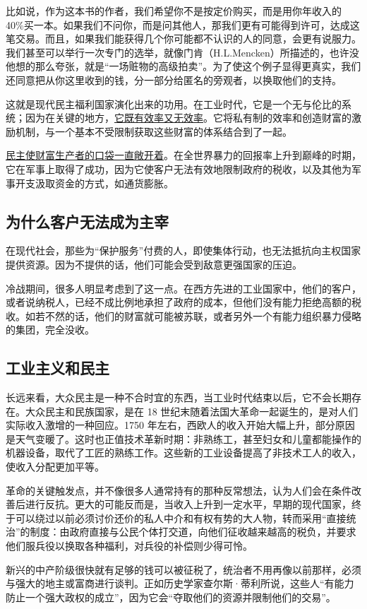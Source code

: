 比如说，作为这本书的作者，我们希望你不是按定价购买，而是用你年收入的 40\%买一本。如果我们不问你，而是问其他人，那我们更有可能得到许可，达成这笔交易。而且，如果我们能获得几个你可能都不认识的人的同意，会更有说服力。我们甚至可以举行一次专门的选举，就像门肯（H.L.Mencken）所描述的，也许没他想的那么夸张，就是“一场赃物的高级拍卖”。为了使这个例子显得更真实，我们还同意把从你这里收到的钱，分一部分给匿名的旁观者，以换取他们的支持。

这就是现代民主福利国家演化出来的功用。在工业时代，它是一个无与伦比的系统；因为在关键的地方，\uline{它既有效率又无效率}。它将私有制的效率和创造财富的激励机制，与一个基本不受限制获取这些财富的体系结合到了一起。

\uline{民主使财富生产者的口袋一直敞开着}。在全世界暴力的回报率上升到巅峰的时期，它在军事上取得了成功，因为它使客户无法有效地限制政府的税收，以及其他为军事开支汲取资金的方式，如通货膨胀。

\subsection{为什么客户无法成为主宰}
在现代社会，那些为“保护服务”付费的人，即使集体行动，也无法抵抗向主权国家提供资源。因为不提供的话，他们可能会受到敌意更强国家的压迫。

冷战期间，很多人明显考虑到了这一点。在西方先进的工业国家中，他们的客户，或者说纳税人，已经不成比例地承担了政府的成本，但他们没有能力拒绝高额的税收。如若不然的话，他们的财富就可能被苏联，或者另外一个有能力组织暴力侵略的集团，完全没收。

\subsection{工业主义和民主}
长远来看，大众民主是一种不合时宜的东西，当工业时代结束以后，它不会长期存在。大众民主和民族国家，是在 18 世纪末随着法国大革命一起诞生的，是对人们实际收入激增的一种回应。1750 年左右，西欧人的收入开始大幅上升，部分原因是天气变暖了。这时也正值技术革新时期：非熟练工，甚至妇女和儿童都能操作的机器设备，取代了工匠的熟练工作。这些新的工业设备提高了非技术工人的收入，使收入分配更加平等。

革命的关键触发点，并不像很多人通常持有的那种反常想法，认为人们会在条件改善后进行反抗。更大的可能反而是，当收入上升到一定水平，早期的现代国家，终于可以绕过以前必须讨价还价的私人中介和有权有势的大人物，转而采用“直接统治”的制度：由政府直接与公民个体打交道，向他们征收越来越高的税负，并要求他们服兵役以换取各种福利，对兵役的补偿则少得可怜。

新兴的中产阶级很快就有足够的钱可以被征税了，统治者不用再像以前那样，必须与强大的地主或富商进行谈判。正如历史学家查尔斯·蒂利所说，这些人“有能力防止一个强大政权的成立”，因为它会“夺取他们的资源并限制他们的交易”。

